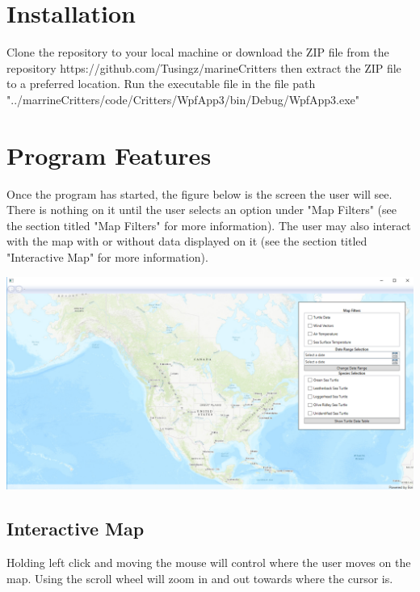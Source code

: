 \documentclass[onecolumn, draftclsnofoot,10pt, compsoc]{IEEEtran}
\begin{document}
\begin{titlepage}
\begin{singlespace}
    \end{singlespace}
\end{titlepage}
\newpage
{}
\tableofcontents
\listoffigures
\clearpage

\section{Installation}
Clone the repository to your local machine or download the ZIP file from the repository https://github.com/Tusingz/marineCritters then extract the ZIP file to a preferred location. Run the executable file in the file path "../marrineCritters/code/Critters/WpfApp3/bin/Debug/WpfApp3.exe"

\section{Program Features}
Once the program has started, the figure below is the screen the user will see. There is nothing on it until the user selects an option under "Map Filters" (see the section titled "Map Filters" for more information). 
\newline The user may also interact with the map with or without data displayed on it (see the section titled "Interactive Map" for more information). 
\newline \begin{center}\includegraphics[width=0.5 \textwidth]{images/startup-program.PNG}\end{center}

\subsection{Interactive Map}
Holding left click and moving the mouse will control where the user moves on the map. Using the scroll wheel will zoom in and out towards where the cursor is.
\end{document}
